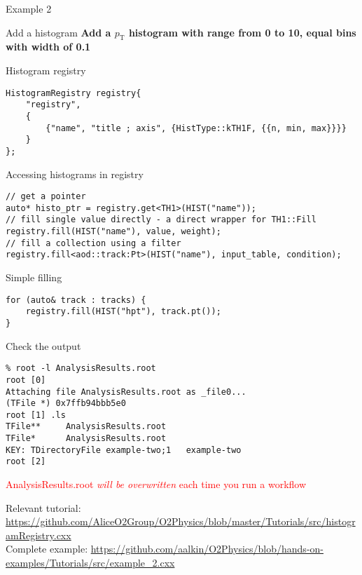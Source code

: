 \documentclass[10pt,lualatex,xcolor={table,svgnames},{hyperref={bookmarks=true,linktoc=all}},aspectratio=169]{beamer}
\begin{document}
\begin{frame}{Example 2}
\begin{block}{Add a histogram}
\textbf{Add a $p_{\text{T}}$ histogram with range from 0 to 10, equal bins with width of 0.1}
\end{block}
\begin{block}{Histogram registry}
\begin{verbatim}
HistogramRegistry registry{
    "registry",
    {
        {"name", "title ; axis", {HistType::kTH1F, {{n, min, max}}}}
    }
};
\end{verbatim}
\end{block}
\begin{block}{Accessing histograms in registry}
\begin{verbatim}
// get a pointer
auto* histo_ptr = registry.get<TH1>(HIST("name"));
// fill single value directly - a direct wrapper for TH1::Fill
registry.fill(HIST("name"), value, weight);
// fill a collection using a filter
registry.fill<aod::track:Pt>(HIST("name"), input_table, condition);
\end{verbatim}
\end{block}
\framebreak
\begin{block}{Simple filling}
\begin{verbatim}
for (auto& track : tracks) {
    registry.fill(HIST("hpt"), track.pt());
}
\end{verbatim}
\end{block}
\begin{block}{Check the output}
\begin{verbatim}
% root -l AnalysisResults.root
root [0]
Attaching file AnalysisResults.root as _file0...
(TFile *) 0x7ffb94bbb5e0
root [1] .ls
TFile**		AnalysisResults.root
TFile*		AnalysisResults.root
KEY: TDirectoryFile	example-two;1	example-two
root [2]
\end{verbatim}

\textcolor{red}{AnalysisResults.root \emph{will be overwritten} each time you run a workflow}
\end{block}

{\footnotesize Relevant tutorial:  \href{https://github.com/AliceO2Group/O2Physics/blob/master/Tutorials/src/histogramRegistry.cxx}{https://github.com/AliceO2Group/O2Physics/blob/master/Tutorials/src/histogramRegistry.cxx} \\
    Complete example: \href{https://github.com/aalkin/O2Physics/blob/hands-on-examples/Tutorials/src/example_2.cxx}{https://github.com/aalkin/O2Physics/blob/hands-on-examples/Tutorials/src/example\_2.cxx}
}
\end{frame}
\end{document}

